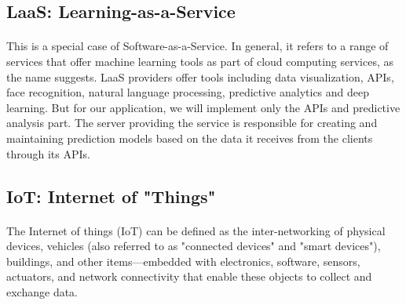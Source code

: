 \begin{comment}
\paragraph{Raspberry Pi}
The Raspberry Pi is an ARM-based Single Board Computer. It was initially launched in the UK to teach programming to school children but being very cheap yet powerful, it became a favorite among computer hobbyists around the world. The latest revision available at the time of writing this report is revision 3. Raspberry Pi runs it's own flavor of Linux based on Debian called Raspbian OS.

\paragraph{SciKit Learn}
SciKit Learn is an open-source machine learning library native to Python that is based on scipy and numpy. SciKit Learn implements a variety of machine learning algorithms in a very efficient way. It also comes with interfaces for many other popular languages.
\end{comment}

\subsection{LaaS: Learning-as-a-Service}
\paragraph{}
This is a special case of Software-as-a-Service. In general, it refers to a range of services that offer machine learning tools as part of cloud computing services, as the name suggests. LaaS providers offer tools including data visualization, APIs, face recognition, natural language processing, predictive analytics and deep learning. But for our application, we will implement only the APIs and predictive analysis part. The server providing the service is responsible for creating and maintaining prediction models based on the data it receives from the clients through its APIs.
\subsection{IoT: Internet of "Things"}
\paragraph{}
The Internet of things (IoT) can be defined as the inter-networking of physical devices, vehicles (also referred to as "connected devices" and "smart devices"), buildings, and other items—embedded with electronics, software, sensors, actuators, and network connectivity that enable these objects to collect and exchange data.
